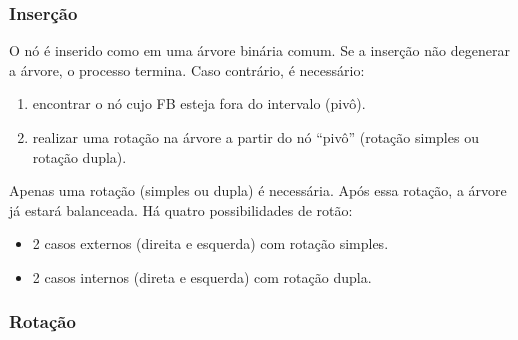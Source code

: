 \subsubsection{Inserção}

O nó é inserido como em uma árvore binária comum.
Se a inserção não degenerar a árvore, o processo termina.
Caso contrário, é necessário:
\begin{enumerate}
\item encontrar o nó cujo FB esteja fora do intervalo (pivô).
\item realizar uma rotação na árvore a partir do nó ``pivô''
(rotação simples ou rotação dupla).
\end{enumerate}
Apenas uma rotação (simples ou dupla) é necessária.
Após essa rotação, a árvore já estará balanceada.
Há quatro possibilidades de rotão:
\begin{itemize}
\item 2 casos externos (direita e esquerda) com rotação simples.
\item 2 casos internos (direta e esquerda) com rotação dupla.
\end{itemize}

\subsubsection{Rotação}

